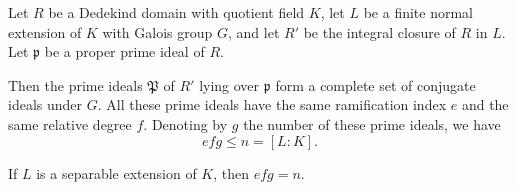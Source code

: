 Let $R$ be a Dedekind domain with quotient field $K$, let $L$ be a finite normal extension of $K$ with Galois group $G$, and let $R'$ be the integral closure of $R$ in $L$. Let $\mathfrak{p}$ be a proper prime ideal of $R$.

Then the prime ideals $\mathfrak{P}$ of $R'$ lying over $\mathfrak{p}$ form a complete set of conjugate ideals under $G$. All these prime ideals have the same ramification index $e$ and the same relative degree $f$. Denoting by $g$ the number of these prime ideals, we have
$$e f g \leq n = [L:K].$$

If $L$ is a separable extension of $K$, then $e f g = n$.
